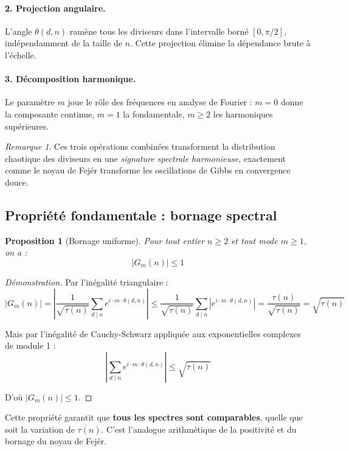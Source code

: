 \documentclass[12pt,a4paper]{article}
\newtheorem{proposition}[theorem]{Proposition}
\theoremstyle{definition}
\theoremstyle{remark}
\newtheorem{remark}{Remarque}[section]
\newcommand{\Gm}[2]{G_{#1}(#2)}              %
\newcommand{\thetaG}[2]{\theta(#1,#2)}       %
\begin{document}
\paragraph{2. Projection angulaire.}
L'angle $\thetaG{d}{n}$ ramène tous les diviseurs dans l'intervalle borné $[0, \pi/2]$, indépendamment de la taille de $n$. Cette projection élimine la dépendance brute à l'échelle.

\paragraph{3. Décomposition harmonique.}
Le paramètre $m$ joue le rôle des fréquences en analyse de Fourier : $m=0$ donne la composante continue, $m=1$ la fondamentale, $m \geq 2$ les harmoniques supérieures.

\begin{remark}
Ces trois opérations combinées transforment la distribution chaotique des diviseurs en une \emph{signature spectrale harmonieuse}, exactement comme le noyau de Fejér transforme les oscillations de Gibbs en convergence douce.
\end{remark}

\subsection{Propriété fondamentale : bornage spectral}

\begin{proposition}[Bornage uniforme]
Pour tout entier $n \geq 2$ et tout mode $m \geq 1$, on a :
\[
|\Gm{m}{n}| \leq 1
\]
\end{proposition}

\begin{proof}[Démonstration]
Par l'inégalité triangulaire :
\[
|\Gm{m}{n}| = \left| \frac{1}{\sqrt{\tau(n)}} \sum_{d \mid n} e^{i \cdot m \cdot \thetaG{d}{n}} \right| \leq \frac{1}{\sqrt{\tau(n)}} \sum_{d \mid n} |e^{i \cdot m \cdot \thetaG{d}{n}}| = \frac{\tau(n)}{\sqrt{\tau(n)}} = \sqrt{\tau(n)}
\]

Mais par l'inégalité de Cauchy-Schwarz appliquée aux exponentielles complexes de module 1 :
\[
\left| \sum_{d \mid n} e^{i \cdot m \cdot \thetaG{d}{n}} \right| \leq \sqrt{\tau(n)}
\]

D'où $|\Gm{m}{n}| \leq 1$.
\end{proof}

Cette propriété garantit que \textbf{tous les spectres sont comparables}, quelle que soit la variation de $\tau(n)$. C'est l'analogue arithmétique de la positivité et du bornage du noyau de Fejér.
\end{document}
